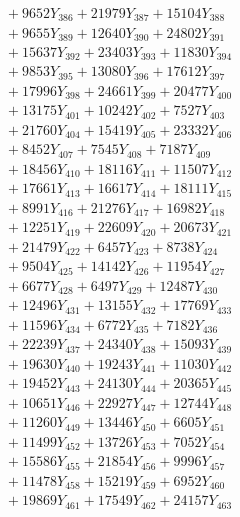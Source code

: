 \documentclass[a4paper,10pt]{article}
\begin{document}
{\begin{align}
&\;  + 9652 Y_{386} + 21979 Y_{387} + 15104 Y_{388} \\[0.5ex]\allowbreak
&\;  + 9655 Y_{389} + 12640 Y_{390} + 24802 Y_{391} \\[0.3ex]
&\;  + 15637 Y_{392} + 23403 Y_{393} + 11830 Y_{394} \\[0.3ex]
&\;  + 9853 Y_{395} + 13080 Y_{396} + 17612 Y_{397} \\[0.3ex]
&\;  + 17996 Y_{398} + 24661 Y_{399} + 20477 Y_{400} \\[0.3ex]
&\;  + 13175 Y_{401} + 10242 Y_{402} + 7527 Y_{403} \\[0.3ex]
&\;  + 21760 Y_{404} + 15419 Y_{405} + 23332 Y_{406} \\[0.3ex]
&\;  + 8452 Y_{407} + 7545 Y_{408} + 7187 Y_{409} \\[0.3ex]
&\;  + 18456 Y_{410} + 18116 Y_{411} + 11507 Y_{412} \\[0.3ex]
&\;  + 17661 Y_{413} + 16617 Y_{414} + 18111 Y_{415} \\[0.3ex]
&\;  + 8991 Y_{416} + 21276 Y_{417} + 16982 Y_{418} \\[0.5ex]\allowbreak
&\;  + 12251 Y_{419} + 22609 Y_{420} + 20673 Y_{421} \\[0.3ex]
&\;  + 21479 Y_{422} + 6457 Y_{423} + 8738 Y_{424} \\[0.3ex]
&\;  + 9504 Y_{425} + 14142 Y_{426} + 11954 Y_{427} \\[0.3ex]
&\;  + 6677 Y_{428} + 6497 Y_{429} + 12487 Y_{430} \\[0.3ex]
&\;  + 12496 Y_{431} + 13155 Y_{432} + 17769 Y_{433} \\[0.3ex]
&\;  + 11596 Y_{434} + 6772 Y_{435} + 7182 Y_{436} \\[0.3ex]
&\;  + 22239 Y_{437} + 24340 Y_{438} + 15093 Y_{439} \\[0.3ex]
&\;  + 19630 Y_{440} + 19243 Y_{441} + 11030 Y_{442} \\[0.3ex]
&\;  + 19452 Y_{443} + 24130 Y_{444} + 20365 Y_{445} \\[0.3ex]
&\;  + 10651 Y_{446} + 22927 Y_{447} + 12744 Y_{448} \\[0.5ex]\allowbreak
&\;  + 11260 Y_{449} + 13446 Y_{450} + 6605 Y_{451} \\[0.3ex]
&\;  + 11499 Y_{452} + 13726 Y_{453} + 7052 Y_{454} \\[0.3ex]
&\;  + 15586 Y_{455} + 21854 Y_{456} + 9996 Y_{457} \\[0.3ex]
&\;  + 11478 Y_{458} + 15219 Y_{459} + 6952 Y_{460} \\[0.3ex]
&\;  + 19869 Y_{461} + 17549 Y_{462} + 24157 Y_{463} \\[0.3ex]

\end{align}}
\end{document}
